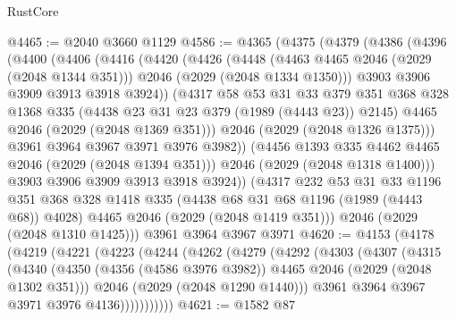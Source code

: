 \begin{lexlean}{RustCore}
\begin{coremodule}
@4465 := @2040 @3660 @1129
@4586 := @4365
    (@4375
      (@4379
        (@4386
          (@4396
            (@4400
              (@4406
                (@4416
                  (@4420
                    (@4426
                      (@4448
                        (@4463 @4465 @2046 (@2029 (@2048 @1344 @351)))
                        @2046
                        (@2029 (@2048 @1334 @1350)))
                      @3903
                      @3906
                      @3909
                      @3913
                      @3918
                      @3924))
                  (@4317
                    @58
                    @53
                    @31
                    @33
                    @379
                    @351
                    @368
                    @328
                    @1368
                    @335
                    (@4438 @23 @31 @23 @379 (@1989 (@4443 @23)) @2145)
                    @4465
                    @2046
                    (@2029 (@2048 @1369 @351)))
                  @2046
                  (@2029 (@2048 @1326 @1375)))
                @3961
                @3964
                @3967
                @3971
                @3976
                @3982))
            (@4456 @1393 @335 @4462 @4465 @2046 (@2029 (@2048 @1394 @351)))
            @2046
            (@2029 (@2048 @1318 @1400)))
          @3903
          @3906
          @3909
          @3913
          @3918
          @3924))
      (@4317
        @232
        @53
        @31
        @33
        @1196
        @351
        @368
        @328
        @1418
        @335
        (@4438 @68 @31 @68 @1196 (@1989 (@4443 @68)) @4028)
        @4465
        @2046
        (@2029 (@2048 @1419 @351)))
      @2046
      (@2029 (@2048 @1310 @1425)))
    @3961
    @3964
    @3967
    @3971
@4620 := @4153
    (@4178
      (@4219
        (@4221
          (@4223
            (@4244
              (@4262
                (@4279
                  (@4292
                    (@4303
                      (@4307
                        (@4315
                          (@4340
                            (@4350
                              (@4356 (@4586 @3976 @3982))
                              @4465
                              @2046
                              (@2029 (@2048 @1302 @351)))
                            @2046
                            (@2029 (@2048 @1290 @1440)))
                          @3961
                          @3964
                          @3967
                          @3971
                          @3976
                          @4136)))))))))))
@4621 := @1582 @87

\end{coremodule}
\end{lexlean}
